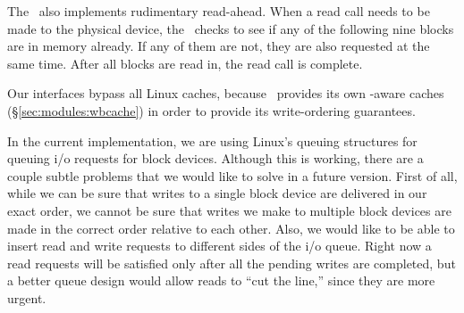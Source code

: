 The \module\ also implements rudimentary read-ahead. When a read call
needs to be made to the physical device, the \module\ checks to see if
any of the following nine blocks are in memory already. If any of them
are not, they are also requested at the same time. After all blocks
are read in, the read call is complete.

Our interfaces bypass all Linux caches, because \Kudos\ provides its
own \chdesc-aware caches (\S\ref{sec:modules:wbcache}) in order to provide its
write-ordering guarantees.

In the current implementation, we are using Linux's queuing structures
for queuing i/o requests for block devices. Although this is working,
there are a couple subtle problems that we would like to solve in a
future version. First of all, while we can be sure that writes to a
single block device are delivered in our exact order, we cannot be
sure that writes we make to multiple block devices are made in the
correct order relative to each other. Also, we would like to be able
to insert read and write requests to different sides of the i/o
queue. Right now a read requests will be satisfied only after all the
pending writes are completed, but a better queue design would allow
reads to ``cut the line,'' since they are more urgent.


